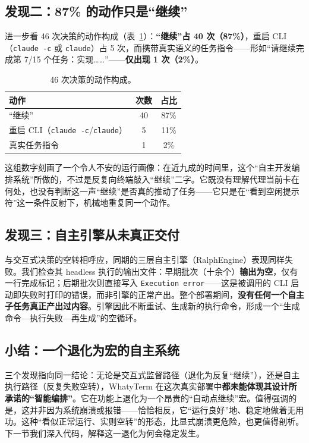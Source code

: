 \subsection{发现二：87\% 的动作只是“继续”}

进一步看 46 次决策的动作构成（表~\ref{tab:actions}）：\textbf{“继续”占 40 次（87\%）}，重启 CLI（\texttt{claude -c} 或 \texttt{claude}）占 5 次，而携带真实语义的任务指令——形如“请继续完成第 7/15 个任务：实现……”——\textbf{仅出现 1 次（2\%）}。

\begin{table}[t]
  \centering\small
  \caption{46 次决策的动作构成。}
  \label{tab:actions}
  \begin{tabular}{@{}lcc@{}}
    \toprule
    动作 & 次数 & 占比 \\
    \midrule
    “继续” & 40 & 87\% \\
    重启 CLI（\texttt{claude -c}/\texttt{claude}） & 5 & 11\% \\
    真实任务指令 & 1 & 2\% \\
    \bottomrule
  \end{tabular}
\end{table}

这组数字刻画了一个令人不安的运行画像：在近九成的时间里，这个“自主开发编排系统”所做的，不过是反复向终端敲入“继续”二字。它既没有理解代理当前卡在何处，也没有判断这一声“继续”是否真的推动了任务——它只是在“看到空闲提示符”这一条件反射下，机械地重复同一个动作。

\subsection{发现三：自主引擎从未真正交付}

与交互式决策的空转相呼应，同期的三层自主引擎（RalphEngine）表现同样失败。我们检查其 headless 执行的输出文件：早期批次（十余个）\textbf{输出为空}，仅有一行完成标记；后期批次则直接写入 \texttt{Execution error}——这是被调用的 CLI 启动即失败时打印的错误，而非引擎的正常产出。整个部署期间，\textbf{没有任何一个自主子任务真正产出过内容}。引擎因此不断重试、生成新的执行命令，形成一个“生成命令—执行失败—再生成”的空循环。

\subsection{小结：一个退化为宏的自主系统}

三个发现指向同一结论：无论是交互式监督路径（退化为反复“继续”），还是自主执行路径（反复失败空转），WhatyTerm 在这次真实部署中\textbf{都未能体现其设计所承诺的“智能编排”}。它在功能上退化为一个昂贵的“自动点继续”宏。值得强调的是，这并非因为系统崩溃或报错——恰恰相反，它“运行良好”地、稳定地做着无用功。这种“看似正常运行、实则空转”的形态，比显式崩溃更危险，也更值得剖析。下一节我们深入代码，解释这一退化为何会稳定发生。
